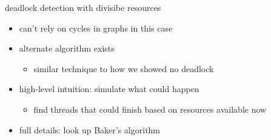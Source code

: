 \begin{frame}{deadlock detection with divisibe resources}
    \begin{itemize}
    \item can't rely on cycles in graphs in this case
    \item alternate algorithm exists
        \begin{itemize}
        \item similar technique to how we showed no deadlock
        \end{itemize}
    \item high-level intuition: simulate what could happen
        \begin{itemize}
        \item find threads that could finish based on resources available now
        \end{itemize}
    \vspace{.5cm}
    \item full details: look up Baker's algorithm
    \end{itemize}
\end{frame}
